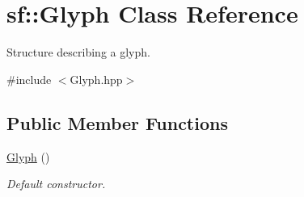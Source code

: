 \hypertarget{classsf_1_1Glyph}{\section{sf\-:\-:Glyph Class Reference}
\label{classsf_1_1Glyph}
}


Structure describing a glyph.  




{\ttfamily \#include $<$Glyph.\-hpp$>$}

\subsection*{Public Member Functions}
\begin{DoxyCompactItemize}
\item 
\hypertarget{classsf_1_1Glyph_ab15cfc37eb7b40a94b3b3aedf934010b}{\hyperlink{classsf_1_1Glyph_ab15cfc37eb7b40a94b3b3aedf934010b}{Glyph} ()}\label{classsf_1_1Glyph_ab15cfc37eb7b40a94b3b3aedf934010b}

\begin{DoxyCompactList}\small\item\em Default constructor. \end{DoxyCompactList}\end{DoxyCompactItemize}
